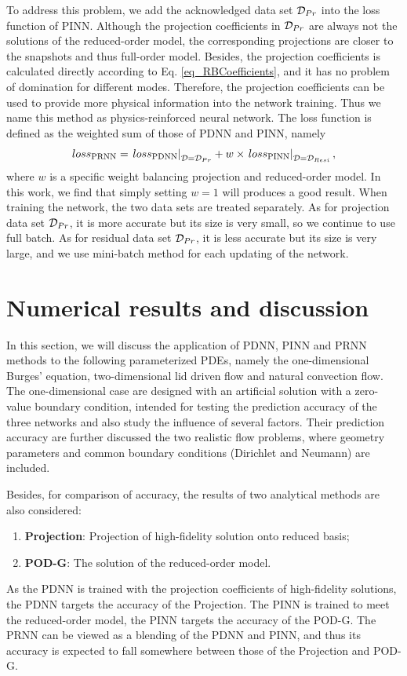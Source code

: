 \documentclass[preprint, 10pt]{elsarticle}
\begin{document}
To address this problem, we add the acknowledged data set ${\cal {D}}_{Pr}$ into the loss function of PINN. Although the projection coefficients in ${\cal {D}}_{Pr}$  are always not the solutions of the reduced-order model, the corresponding projections are closer to the snapshots and thus full-order model. Besides, the projection coefficients is calculated directly according to Eq. \ref{eq_RBCoefficients}, and it has no problem of domination for different modes. Therefore, the projection coefficients can be used to provide more physical information into the network training. Thus we name this method as physics-reinforced neural network. The loss function is defined as the weighted sum of those of PDNN and PINN, namely
\begin{equation}
{loss}_{\rm{PRNN}} =
\left. {{loss}_{\rm{PDNN}}} \right|_{{\cal{D}} = {\cal {D}}_{Pr} }
+
w \times \left. {{loss}_{\rm{PINN}}} \right|_{{\cal D} = {\cal D}_{Resi }},
\label{eq_lossPRNN}
\end{equation}
where $w$ is a specific weight balancing projection and reduced-order model. In this work, we find that simply setting $w=1$ will produces a good result.  When training the network, the two data sets are treated separately. As for projection data set ${\cal D}_{Pr}$, it is more accurate but its size is very small, so we continue to use full batch. As for residual data set ${\cal D}_{Pr}$, it is less accurate but its size is very large, and we use mini-batch method for each updating of the network.

\section{Numerical results and discussion}
In this section,
we will discuss the application of PDNN, PINN and PRNN methods to the following parameterized PDEs, namely the one-dimensional Burges' equation, two-dimensional lid driven flow and natural convection flow.
The one-dimensional case are designed with an artificial solution with a zero-value boundary condition, intended for testing the prediction accuracy of the three networks and also study the influence of several factors. Their prediction accuracy are further discussed the two realistic flow problems, where geometry parameters and common boundary conditions (Dirichlet and Neumann) are included.

Besides, for comparison of accuracy, the results of two analytical methods are also considered:
\begin{enumerate}[(1)]
\item \textbf{Projection}: Projection of high-fidelity solution onto reduced basis;
\item \textbf{POD-G}: The solution of the reduced-order model.
\end{enumerate}
As the PDNN is trained with the projection coefficients of high-fidelity solutions, the PDNN targets the accuracy of the Projection. The PINN is trained to meet the reduced-order model, the PINN targets the accuracy of the POD-G. The PRNN can be viewed as a blending of the PDNN and PINN, and thus its accuracy is expected to fall somewhere between those of the Projection and POD-G.
\end{document}
